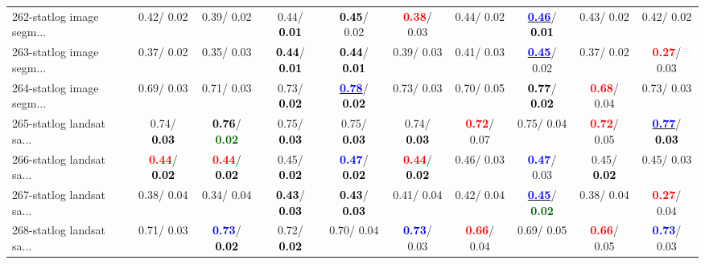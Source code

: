 \begin{table}[h]
\begin{center}
{\begin{tabular}{lc|c|c|c|c|c|c|c|c}
262-statlog image segm... &   0.42/  0.02 &   0.39/  0.02 &   0.44/\textcolor{black}{\textbf{  0.01}} & \textcolor{black}{\textbf{  0.45}}/  0.02 & \textcolor{red}{\textbf{  0.38}}/  0.03 &   0.44/  0.02 & \underline{\textcolor{blue}{\textbf{  0.46}}}/\textcolor{black}{\textbf{  0.01}} &   0.43/  0.02 &   0.42/  0.02 \\
263-statlog image segm... &   0.37/  0.02 &   0.35/  0.03 & \textcolor{black}{\textbf{  0.44}}/\textcolor{black}{\textbf{  0.01}} & \textcolor{black}{\textbf{  0.44}}/\textcolor{black}{\textbf{  0.01}} &   0.39/  0.03 &   0.41/  0.03 & \underline{\textcolor{blue}{\textbf{  0.45}}}/  0.02 &   0.37/  0.02 & \textcolor{red}{\textbf{  0.27}}/  0.03 \\ \hline
264-statlog image segm... &   0.69/  0.03 &   0.71/  0.03 &   0.73/\textcolor{black}{\textbf{  0.02}} & \underline{\textcolor{blue}{\textbf{  0.78}}}/\textcolor{black}{\textbf{  0.02}} &   0.73/  0.03 &   0.70/  0.05 & \textcolor{black}{\textbf{  0.77}}/\textcolor{black}{\textbf{  0.02}} & \textcolor{red}{\textbf{  0.68}}/  0.04 &   0.73/  0.03 \\
265-statlog landsat sa... &   0.74/\textcolor{black}{\textbf{  0.03}} & \textcolor{black}{\textbf{  0.76}}/\textcolor{darkgreen}{\textbf{  0.02}} &   0.75/\textcolor{black}{\textbf{  0.03}} &   0.75/\textcolor{black}{\textbf{  0.03}} &   0.74/\textcolor{black}{\textbf{  0.03}} & \textcolor{red}{\textbf{  0.72}}/  0.07 &   0.75/  0.04 & \textcolor{red}{\textbf{  0.72}}/  0.05 & \underline{\textcolor{blue}{\textbf{  0.77}}}/\textcolor{black}{\textbf{  0.03}} \\
266-statlog landsat sa... & \textcolor{red}{\textbf{  0.44}}/\textcolor{black}{\textbf{  0.02}} & \textcolor{red}{\textbf{  0.44}}/\textcolor{black}{\textbf{  0.02}} &   0.45/\textcolor{black}{\textbf{  0.02}} & \textcolor{blue}{\textbf{  0.47}}/\textcolor{black}{\textbf{  0.02}} & \textcolor{red}{\textbf{  0.44}}/\textcolor{black}{\textbf{  0.02}} &   0.46/  0.03 & \textcolor{blue}{\textbf{  0.47}}/  0.03 &   0.45/\textcolor{black}{\textbf{  0.02}} &   0.45/  0.03 \\
267-statlog landsat sa... &   0.38/  0.04 &   0.34/  0.04 & \textcolor{black}{\textbf{  0.43}}/\textcolor{black}{\textbf{  0.03}} & \textcolor{black}{\textbf{  0.43}}/\textcolor{black}{\textbf{  0.03}} &   0.41/  0.04 &   0.42/  0.04 & \underline{\textcolor{blue}{\textbf{  0.45}}}/\textcolor{darkgreen}{\textbf{  0.02}} &   0.38/  0.04 & \textcolor{red}{\textbf{  0.27}}/  0.04 \\
268-statlog landsat sa... &   0.71/  0.03 & \textcolor{blue}{\textbf{  0.73}}/\textcolor{black}{\textbf{  0.02}} &   0.72/\textcolor{black}{\textbf{  0.02}} &   0.70/  0.04 & \textcolor{blue}{\textbf{  0.73}}/  0.03 & \textcolor{red}{\textbf{  0.66}}/  0.04 &   0.69/  0.05 & \textcolor{red}{\textbf{  0.66}}/  0.05 & \textcolor{blue}{\textbf{  0.73}}/  0.03 \\

\end{tabular}}
\end{center}
\end{table}
